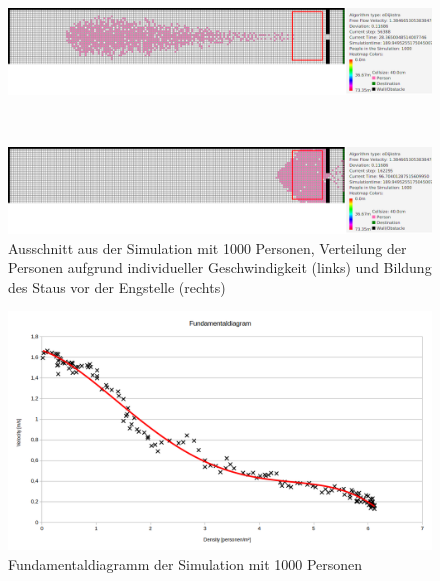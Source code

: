 \begin{figure}
\centering
\begin{minipage}{1\textwidth}
\centering
  \includegraphics[width=1\linewidth]{abbildungen/engstelle/1000P/engstelle1000personenVORmessbereich.png}
\end{minipage}%
\\
\begin{minipage}{1\textwidth}
\centering
  \includegraphics[width=1\linewidth]{abbildungen/engstelle/1000P/engstelle1000personenMAXmessbereich.png} 
 \end{minipage}
\caption{Ausschnitt aus der Simulation mit 1000 Personen, Verteilung der Personen aufgrund individueller Geschwindigkeit (links) und Bildung des Staus vor der Engstelle (rechts)}
\label{fig:engstelle1000p}
\end{figure}

\begin{figure}[ht]
	\centering
  \includegraphics[width=\textwidth]{abbildungen/engstelle/1000P/fundamentalDiagram1000persons.png}
	\caption{Fundamentaldiagramm der Simulation mit 1000 Personen}
	\label{fig:engstelle1000pFUNDA}
\end{figure}

